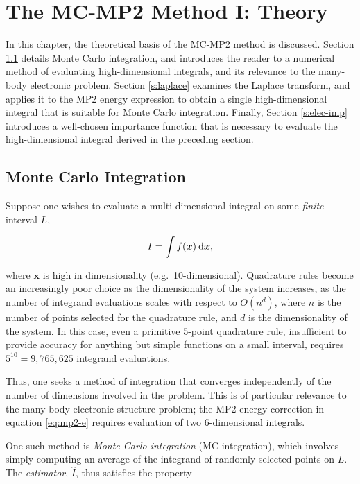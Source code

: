 \chapter{The MC-MP2 Method I: Theory}

In this chapter, the theoretical basis of the MC-MP2 method is discussed.
Section \ref{s:mc-int} details Monte Carlo integration, and introduces the
reader to a numerical method of evaluating high-dimensional integrals, and its
relevance to the many-body electronic problem. Section \ref{s:laplace} examines
the Laplace transform, and applies it to the MP2 energy expression to obtain a
single high-dimensional integral that is suitable for Monte Carlo integration.
Finally, Section \ref{s:elec-imp} introduces a well-chosen importance function
that is necessary to evaluate the high-dimensional integral derived in the
preceding section.

\section{Monte Carlo Integration}
\label{s:mc-int}

Suppose one wishes to evaluate a multi-dimensional integral on some
\emph{finite} interval $L$,

\begin{equation}
I = \int f(\bm x) \:\mathrm{d} \bm x,
\label{eq:mc-int}
\end{equation}

\noindent where $\bm x$ is high in dimensionality (e.g.\ 10-dimensional).
Quadrature rules become an increasingly poor choice as the dimensionality of the
system increases, as the number of integrand evaluations scales with respect to
$O(n^d)$, where $n$ is the number of points selected for the quadrature rule,
and $d$ is the dimensionality of the system. In this case, even a primitive
5-point quadrature rule, insufficient to provide accuracy for anything but
simple functions on a small interval, requires $5^{10} = 9,765,625$ integrand
evaluations.

Thus, one seeks a method of integration that converges independently of the
number of dimensions involved in the problem. This is of particular relevance to
the many-body electronic structure problem; the MP2 energy correction in
equation \ref{eq:mp2-e} requires evaluation of two 6-dimensional integrals.

One such method is \emph{Monte Carlo integration} (MC integration), which
involves simply computing an average of the integrand of randomly selected
points on $L$. The \emph{estimator}, $\hat I$, thus satisfies the property

